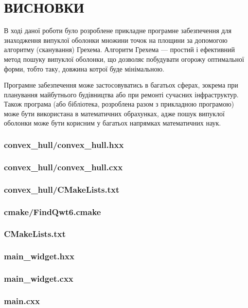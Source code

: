 \documentclass[simple,14pt,utf8,ukrainian]{eskdtext}
\begin{document}
  \clearpage
  \newpage

\section*{ВИСНОВКИ}
  В ході даної роботи було розроблене прикладне програмне забезпечення для
  знаходження випуклої оболонки множини точок на площини за допомогою
  алгоритму (сканування) Грехема.
  Алгоритм Грехема --- простий і ефективний метод пошуку випуклої оболонки,
  що дозволяє побудувати огорожу оптимальної форми, тобто таку, довжина котрої
  буде мінімальною.

  Програмне забезпечення може застосовуватись в багатьох сферах, зокрема при
  планування майбутнього будівництва або при ремонті сучасних інфраструктур.
  Також програма (або бібліотека, розроблена разом з прикладною програмою)
  може бути використана в математичних обрахунках, адже пошук випуклої
  оболонки може бути корисним у багатьох напрямках математичних наук.
  \newpage
    
    \renewcommand\bibname{Foo}
    
    \newpage
     \subsubsection*{convex\_hull/convex\_hull.hxx}
      
     \subsubsection*{convex\_hull/convex\_hull.cxx}
      
     \subsubsection*{convex\_hull/CMakeLists.txt}
      
     \subsubsection*{cmake/FindQwt6.cmake}
     
     \subsubsection*{CMakeLists.txt}
      
     \subsubsection*{main\_widget.hxx}
      
      \subsubsection*{main\_widget.cxx}
      
      \subsubsection*{main.cxx}
      
\end{document}
